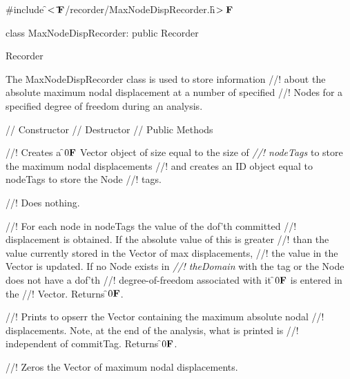 
\indent \#include \f$<\tilde{ }{\bf F}$/recorder/MaxNodeDispRecorder.h\f$>{\bf F}$

\indent class MaxNodeDispRecorder: public Recorder

\indent Recorder
\indent{}

\indent The MaxNodeDispRecorder class is used to store information
//! about the absolute maximum nodal displacement at a number of specified
//! Nodes for a specified degree of freedom during an analysis.

\indent // Constructor
\indent // Destructor
\indent // Public Methods

//! Creates a \f$0{\bf F}$ Vector object of size equal to the size of {\em
//! nodeTags} to store the maximum nodal displacements
//! and creates an ID object equal to \p nodeTags to store the Node
//! tags.

//! Does nothing.

//! For each node in \p nodeTags the value of the \p dof'th committed
//! displacement is obtained. If the absolute value of this is greater
//! than the value currently stored in the Vector of max displacements,
//! the value in the Vector is updated. If no Node exists in {\em
//! theDomain} with the tag or the Node does not have a \p dof'th
//! degree-of-freedom associated with it \f$0{\bf F}$ is entered in the
//! Vector. Returns \f$0{\bf F}$.

//! Prints to \p opserr the Vector containing the maximum absolute nodal
//! displacements. Note, at the end of the analysis, what is printed is
//! independent of \p commitTag. Returns \f$0{\bf F}$.

//! Zeros the Vector of maximum nodal displacements.
